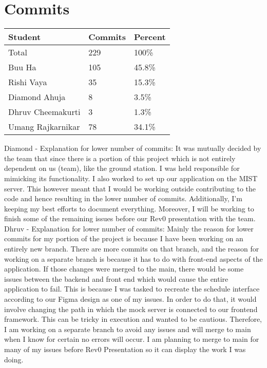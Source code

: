 \documentclass{article}
\begin{document}
\section{Commits}

\begin{table}[H]
\centering
\begin{tabular}{lll}
\toprule
\textbf{Student} & \textbf{Commits} & \textbf{Percent}\\
\midrule
Total & 229 & 100\% \\
Buu Ha & 105 & 45.8\% \\
Rishi Vaya & 35 & 15.3\% \\
Diamond Ahuja & 8 & 3.5\% \\
Dhruv Cheemakurti & 3 & 1.3\% \\
Umang Rajkarnikar & 78 & 34.1\% \\
\bottomrule
\end{tabular}
\end{table}

Diamond - Explanation for lower number of commits: It was mutually decided by the team that since there is a portion of this project which is not entirely dependent on us (team), like the ground station. I was held responsible for mimicking its functionality. I also worked to set up our application on the MIST server. This however meant that I would be working outside contributing to the code and hence resulting in the lower number of commits. Additionally, I'm keeping my best efforts to document everything. Moreover, I will be working to finish some of the remaining issues before our Rev0 presentation with the team. \\

Dhruv - Explanation for lower number of commits: Mainly the reason for lower commits for my portion of the project is because I have been working on an entirely new branch. There are more commits on that branch, and the reason for working on a separate branch is because it has to do with front-end aspects of the application. If those changes were merged to the main, there would be some issues between the backend and front end which would cause the entire application to fail. This is because I was tasked to recreate the schedule interface according to our Figma design as one of my issues. In order to do that, it would involve changing the path in which the mock server is connected to our frontend framework. This can be tricky in execution and wanted to be cautious. Therefore, I am working on a separate branch to avoid any issues and will merge to main when I know for certain no errors will occur. I am planning to merge to main for many of my issues before Rev0 Presentation so it can display the work I was doing.
\end{document}
